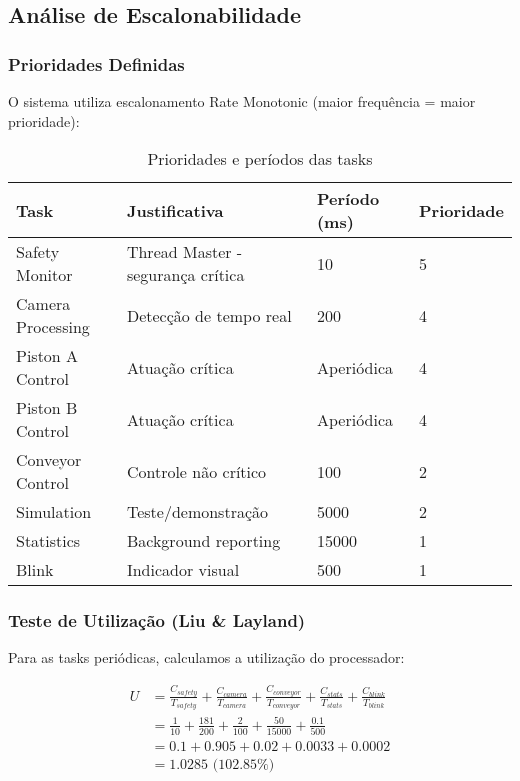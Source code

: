 \documentclass[12pt,a4paper]{article}
\begin{document}
\subsection{Análise de Escalonabilidade}

\subsubsection{Prioridades Definidas}

O sistema utiliza escalonamento Rate Monotonic (maior frequência = maior prioridade):

\begin{table}[H]
\centering
\begin{tabularx}{\textwidth}{lXll}
\toprule
\textbf{Task} & \textbf{Justificativa} & \textbf{Período (ms)} & \textbf{Prioridade} \\
\midrule
Safety Monitor & Thread Master - segurança crítica & 10 & 5 \\
Camera Processing & Detecção de tempo real & 200 & 4 \\
Piston A Control & Atuação crítica & Aperiódica & 4 \\
Piston B Control & Atuação crítica & Aperiódica & 4 \\
Conveyor Control & Controle não crítico & 100 & 2 \\
Simulation & Teste/demonstração & 5000 & 2 \\
Statistics & Background reporting & 15000 & 1 \\
Blink & Indicador visual & 500 & 1 \\
\bottomrule
\end{tabularx}
\caption{Prioridades e períodos das tasks}
\end{table}

\subsubsection{Teste de Utilização (Liu \& Layland)}

Para as tasks periódicas, calculamos a utilização do processador:

\begin{align}
U &= \frac{C_{safety}}{T_{safety}} + \frac{C_{camera}}{T_{camera}} + \frac{C_{conveyor}}{T_{conveyor}} + \frac{C_{stats}}{T_{stats}} + \frac{C_{blink}}{T_{blink}} \\
&= \frac{1}{10} + \frac{181}{200} + \frac{2}{100} + \frac{50}{15000} + \frac{0.1}{500} \\
&= 0.1 + 0.905 + 0.02 + 0.0033 + 0.0002 \\
&= 1.0285 \text{ (102.85\%)}
\end{align}
\end{document}
